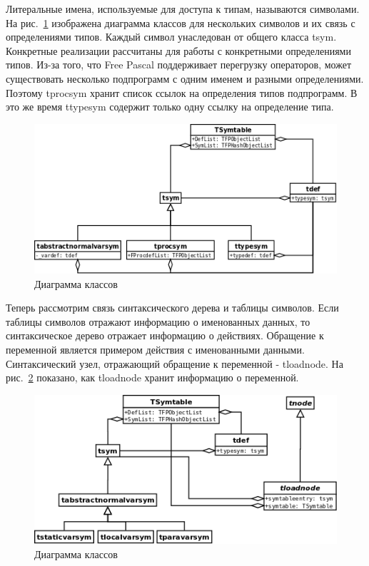 \documentclass{imcs}
\begin{document}
Литеральные имена, используемые для доступа к типам, называются символами. На
рис.~\ref{sym-def-sym-inheritence} изображена диаграмма классов для нескольких символов и 
их связь с определениями типов. Каждый символ унаследован от общего класса tsym. Конкретные
реализации рассчитаны для работы с конкретными определениями типов. 
Из-за того, что Free Pascal поддерживает перегрузку операторов, может существовать несколько
подпрограмм с одним именем и разными определениями. Поэтому tprocsym хранит список ссылок на 
определения типов подпрограмм. В это же время ttypesym содержит только одну ссылку на
определение типа.

\begin{figure}[htb]
\centering
\includegraphics{./uml/sym-def-sym-inheritence.png}
\caption{Диаграмма классов}
\label{sym-def-sym-inheritence}
\end{figure}

Теперь рассмотрим связь синтаксического дерева и таблицы символов. Если таблицы символов отражают
информацию о именованных данных, то синтаксическое дерево отражает информацию о действиях. 
Обращение к переменной является примером действия с именованными данными. Синтаксический
узел, отражающий обращение к переменной - tloadnode. На рис.~\ref{sym-node} показано, как tloadnode
хранит информацию о переменной.

\begin{figure}[htb]
\centering
\includegraphics{./uml/sym-node.png}
\caption{Диаграмма классов}
\label{sym-node}
\end{figure}
\end{document}
